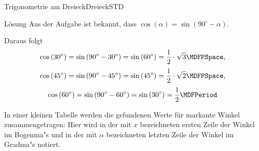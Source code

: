 \begin{MXContent}{Trigonometrie am Dreieck}{Dreieck}{STD}
\begin{MExercise}
\begin{MHint}{L\"osung}
Aus der Aufgabe  ist bekannt, dass $\cos\left(\alpha\right)= \sin\left(90^\circ-\alpha\right)$.

Daraus folgt
\[\cos\left(30^\circ\right)=\sin\left(90^\circ-30^\circ\right)=\sin\left(60^\circ\right)=\frac{1}{2}\cdot\sqrt{3} \MDFPSpace, \]
\[\cos\left(45^\circ\right)=\sin\left(90^\circ-45^\circ\right)=\sin\left(45^\circ\right)=\frac{1}{2}\cdot\sqrt{2} \MDFPSpace, \]
\[\cos\left(60^\circ\right)=\sin\left(90^\circ-60^\circ\right)=\sin\left(30^\circ\right)=\frac{1}{2} \MDFPeriod\]
\end{MHint}
\end{MExercise}

In einer kleinen Tabelle werden die gefundenen Werte f\"ur markante Winkel 
zusammengetragen:
Hier wird in der mit $x$ bezeichneten ersten Zeile der Winkel im Bogenma"s und 
in der mit $\alpha$ bezeichneten letzten Zeile der Winkel im Gradma"s notiert.


\end{MXContent}
